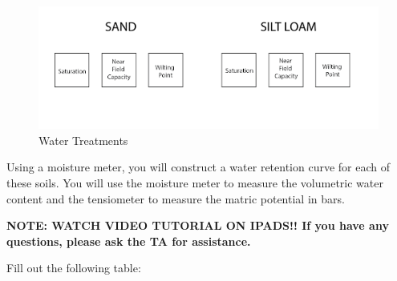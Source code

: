 \documentclass[
  letterpaper,
  twocolumn,
  portrait]{scrbook}
\begin{document}
\begin{figure}

{\centering \includegraphics{soil-water-sand-siltloam-Picture1.png}

}

\caption{\label{fig-soilwater}Water Treatments}

\end{figure}

Using a moisture meter, you will construct a water retention curve for
each of these soils. You will use the moisture meter to measure the
volumetric water content and the tensiometer to measure the matric
potential in bars.

\textbf{NOTE: WATCH VIDEO TUTORIAL ON IPADS!! If you have any questions,
please ask the TA for assistance.}

Fill out the following table:

 
  \providecommand{\huxb}[2]{\arrayrulecolor[RGB]{#1}\global\arrayrulewidth=#2pt}
  \providecommand{\huxvb}[2]{\color[RGB]{#1}\vrule width #2pt}
  \providecommand{\huxtpad}[1]{\rule{0pt}{#1}}
  \providecommand{\huxbpad}[1]{\rule[-#1]{0pt}{#1}}
\end{document}
